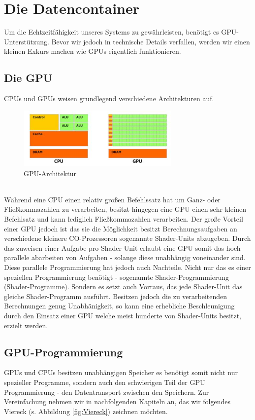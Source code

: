 \section{Die Datencontainer}
\begin{Spacing}{\mylinespace}
Um die Echtzeitfähigkeit unseres Systems zu gewährleisten, benötigt es GPU-Unterstützung.
Bevor wir jedoch in technische Details verfallen, werden wir einen kleinen Exkurs machen wie GPUs eigentlich funktionieren.
\subsection{Die GPU}
CPUs und GPUs weisen grundlegend verschiedene Architekturen auf.
\begin{figure}[h!]
	\vspace*{30px}
	\centering
	\includegraphics[width=300px]{graphics/GPUvsCPU.jpg}	
	\caption{GPU-Architektur\protect\footnotemark}
	\label{fig:GPUvsCPU}
\end{figure}
\\
Während eine CPU einen relativ großen Befehlssatz hat um Ganz- oder Fließkommazahlen zu verarbeiten, besitzt hingegen eine GPU einen sehr kleinen Befehlsatz und kann lediglich Fließkommazahlen verarbeiten.
Der große Vorteil einer GPU jedoch ist das sie die Möglichkeit besitzt Berechnungsaufgaben an verschiedene kleinere CO-Prozessoren sogenannte Shader-Units abzugeben.
Durch das zuweisen einer Aufgabe pro Shader-Unit erlaubt eine GPU somit das hoch-parallele abarbeiten von Aufgaben - solange diese unabhängig voneinander sind.
Diese parallele Programmierung hat jedoch auch Nachteile.
Nicht nur das es einer speziellen Programmierung benötigt - sogenannte Shader-Programmierung (Shader-Programme).
Sondern es setzt auch Vorraus, das jede Shader-Unit das gleiche Shader-Programm ausführt.
Besitzen jedoch die zu verarbeitenden Berechnungen genug Unabhänigkeit, so kann eine erhebliche Beschleunigung durch den Einsatz einer GPU welche meist hunderte von Shader-Units besitzt, erzielt werden.


\subsection{GPU-Programmierung}
GPUs und CPUs besitzen unabhängigen Speicher es benötigt somit nicht nur spezieller Programme, sondern auch den schwierigen Teil der GPU Programmierung - den Datentransport zwischen den Speichern.
Zur Vereinfachung nehmen wir in nachfolgenden Kapiteln an, das wir folgendes Viereck (s. Abbildung \ref{fig:Viereck}) zeichnen möchten.


\end{Spacing}
